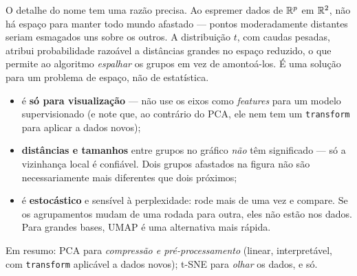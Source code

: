 \documentclass[11pt,a4paper]{article}
\begin{document}
\begin{ideia}
O detalhe do nome tem uma razão precisa. Ao espremer dados de $\mathbb{R}^p$ em $\mathbb{R}^2$, não
há espaço para manter todo mundo afastado --- pontos moderadamente distantes seriam
esmagados uns sobre os outros. A distribuição $t$, com caudas pesadas, atribui
probabilidade razoável a distâncias grandes no espaço reduzido, o que permite ao
algoritmo \emph{espalhar} os grupos em vez de amontoá-los. É uma solução para um
problema de espaço, não de estatística.
\end{ideia}

\begin{atencao}
\begin{itemize}[leftmargin=1.2cm,nosep]
  \item é \textbf{só para visualização} --- não use os eixos como \emph{features}
        para um modelo supervisionado (e note que, ao contrário do PCA, ele nem tem
        um \texttt{transform} para aplicar a dados novos);
  \item \textbf{distâncias e tamanhos} entre grupos no gráfico \emph{não} têm
        significado --- só a vizinhança local é confiável. Dois grupos afastados na
        figura não são necessariamente mais diferentes que dois próximos;
  \item é \textbf{estocástico} e sensível à perplexidade: rode mais de uma vez e
        compare. Se os agrupamentos mudam de uma rodada para outra, eles não estão
        nos dados. Para grandes bases, UMAP é uma alternativa mais rápida.
\end{itemize}
\end{atencao}

\noindent Em resumo: PCA para \emph{compressão e pré-processamento} (linear,
interpretável, com \texttt{transform} aplicável a dados novos); t-SNE para
\emph{olhar} os dados, e só.

\end{document}
